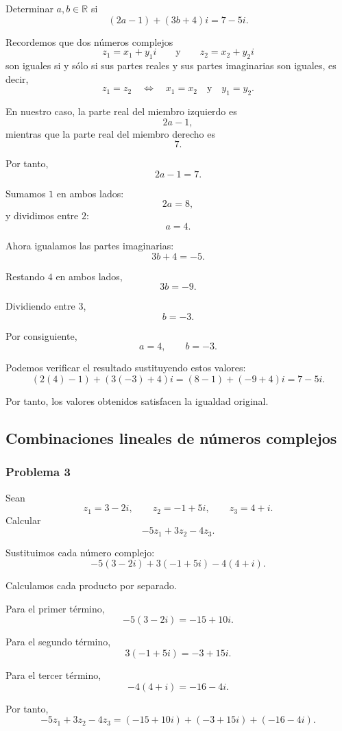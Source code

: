 Determinar $a,b\in\mathbb{R}$ si
\[
(2a-1)+(3b+4)i=7-5i.
\]

Recordemos que dos números complejos
\[
z_1=x_1+y_1i
\qquad\text{y}\qquad
z_2=x_2+y_2i
\]
son iguales si y sólo si sus partes reales y sus partes imaginarias son
iguales, es decir,
\[
z_1=z_2
\quad\Longleftrightarrow\quad
x_1=x_2
\quad\text{y}\quad
y_1=y_2.
\]

En nuestro caso, la parte real del miembro izquierdo es
\[
2a-1,
\]
mientras que la parte real del miembro derecho es
\[
7.
\]

Por tanto,
\[
2a-1=7.
\]

Sumamos $1$ en ambos lados:
\[
2a=8,
\]
y dividimos entre $2$:
\[
\boxed{a=4}.
\]

Ahora igualamos las partes imaginarias:
\[
3b+4=-5.
\]

Restando $4$ en ambos lados,
\[
3b=-9.
\]

Dividiendo entre $3$,
\[
\boxed{b=-3}.
\]

Por consiguiente,
\[
\boxed{a=4,\qquad b=-3}.
\]

Podemos verificar el resultado sustituyendo estos valores:
\[
(2(4)-1)+(3(-3)+4)i
=
(8-1)+(-9+4)i
=
7-5i.
\]

Por tanto, los valores obtenidos satisfacen la igualdad original.

\subsection{Combinaciones lineales de números complejos}

\subsubsection*{Problema 3}

Sean
\[
z_1=3-2i,
\qquad
z_2=-1+5i,
\qquad
z_3=4+i.
\]
Calcular
\[
-5z_1+3z_2-4z_3.
\]

Sustituimos cada número complejo:
\[
-5(3-2i)+3(-1+5i)-4(4+i).
\]

Calculamos cada producto por separado.

Para el primer término,
\[
-5(3-2i)
=
-15+10i.
\]

Para el segundo término,
\[
3(-1+5i)
=
-3+15i.
\]

Para el tercer término,
\[
-4(4+i)
=
-16-4i.
\]

Por tanto,
\[
-5z_1+3z_2-4z_3
=
(-15+10i)+(-3+15i)+(-16-4i).
\]

